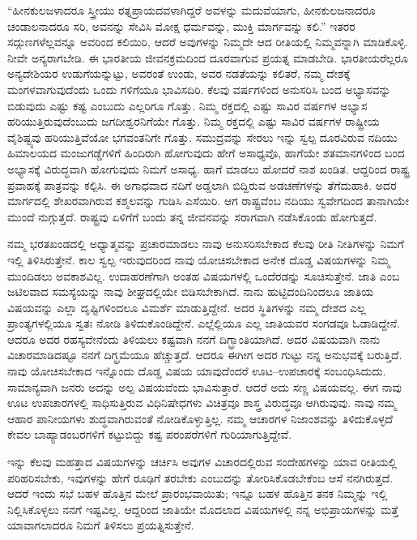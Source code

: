 “ಹೀನಕುಲಜಳಾದರೂ ಸ್ತ್ರೀಯು ರತ್ನಪ್ರಾಯದವಳಾಗಿದ್ದರೆ ಅವಳನ್ನು ಮದುವೆಯಾಗು, ಹೀನಕುಲಜನಾದರೂ ಚಂಡಾಲನಾದರೂ ಸರಿ, ಅವನನ್ನು ಸೇವಿಸಿ ಮೋಕ್ಷ ಧರ್ಮವನ್ನು, ಮುಕ್ತಿ ಮಾರ್ಗವನ್ನು ಕಲಿ.” ಇತರರ ಸದ್ಗುಣಗಳೆಲ್ಲವನ್ನೂ ಅವರಿಂದ ಕಲಿಯಿರಿ, ಆದರೆ ಅವುಗಳನ್ನು ನಿಮ್ಮದೇ ಆದ ರೀತಿಯಲ್ಲಿ ನಿಮ್ಮವನ್ನಾಗಿ ಮಾಡಿಕೊಳ್ಳಿ. ನೀವೇ ಅನ್ಯರಾಗಬೇಡಿ. ಈ ಭಾರತೀಯ ಜೀವನಕ್ರಮದಿಂದ ದೂರವಾಗುವ ಪ್ರಯತ್ನ ಮಾಡಬೇಡಿ. ಭಾರತೀಯರೆಲ್ಲರೂ ಅನ್ಯದೇಶಿಯರ ಉಡುಗೆಯನ್ನುಟ್ಟು, ಅವರಂತೆ ಉಂಡು, ಅವರ ನಡತೆಯನ್ನು ಕಲಿತರೆ, ನಮ್ಮ ದೇಶಕ್ಕೆ ಮಂಗಳವಾಗುವುದೆಂದು ಒಂದು ಗಳಿಗೆಯೂ ಭಾವಿಸದಿರಿ. ಕೆಲವು ವರ್ಷಗಳಿಂದ ಅನುಸರಿಸಿ ಬಂದ ಅಭ್ಯಾಸವನ್ನು ಬಿಡುವುದು ಎಷ್ಟು ಕಷ್ಟ ಎಂಬುದು ಎಲ್ಲರಿಗೂ ಗೊತ್ತು. ನಿಮ್ಮ ರಕ್ತದಲ್ಲಿ ಎಷ್ಟು ಸಾವಿರ ವರ್ಷಗಳ ಅಭ್ಯಾಸ ಹರಿಯುತ್ತಿರುವುದೆಂಬುದು ಜಗದೀಶ್ವರನಿಗೆಯೇ ಗೊತ್ತು. ನಿಮ್ಮ ರಕ್ತದಲ್ಲಿ ಎಷ್ಟು ಸಾವಿರ ವರ್ಷಗಳ ರಾಷ್ಟ್ರೀಯ ವೈಶಿಷ್ಟ್ಯವು ಹರಿಯುತ್ತಿವೆಯೋ ಭಗವಂತನಿಗೇ ಗೊತ್ತು. ಸಮುದ್ರವನ್ನು ಸೇರಲು ಇನ್ನು ಸ್ವಲ್ಪ ದೂರವಿರುವ ನದಿಯು ಹಿಮಾಲಯದ ಮಂಜುಗಡ್ಡೆಗಳಿಗೆ ಹಿಂದಿರುಗಿ ಹೋಗುವುದು ಹೇಗೆ ಅಸಾಧ್ಯವೊ, ಹಾಗೆಯೇ ಶತಮಾನಗಳಿಂದ ಬಂದ ಅಭ್ಯಾಸಕ್ಕೆ ವಿರುದ್ಧವಾಗಿ ಹೋಗುವುದು ನಿಮಗೆ ಅಸಾಧ್ಯ. ಹಾಗೆ ಮಾಡಲು ಹೋದರೆ ನಾಶ ಖಂಡಿತ. ಆದ್ದರಿಂದ ರಾಷ್ಟ್ರ ಪ್ರವಾಹಕ್ಕೆ ಪಾತ್ರವನ್ನು ಕಲ್ಪಿಸಿ. ಈ ಅಗಾಧವಾದ ನದಿಗೆ ಅಡ್ಡಲಾಗಿ ಬಿದ್ದಿರುವ ಅಡಚಣೆಗಳನ್ನು ತೆಗೆದುಹಾಕಿ. ಅದರ ಮಾರ್ಗದಲ್ಲಿ ಶೇಖರವಾಗಿರುವ ಕಶ್ಮಲವನ್ನು ಗುಡಿಸಿ ಎಸೆಯಿರಿ. ಆಗ ರಾಷ್ಟ್ರವೆಂಬ ನದಿಯು ಸ್ವವೇಗದಿಂದ ತಾನಾಗಿಯೇ ಮುಂದೆ ನುಗ್ಗುತ್ತದೆ. ರಾಷ್ಟ್ರವು ಏಳಿಗೆಗೆ ಬಂದು ತನ್ನ ಜೀವನವನ್ನು ಸರಾಗವಾಗಿ ನಡೆಸಿಕೊಂಡು ಹೋಗುತ್ತದೆ.

ನಮ್ಮ ಭರತಖಂಡದಲ್ಲಿ ಅಧ್ಯಾತ್ಮವನ್ನು ಪ್ರಚಾರಮಾಡಲು ನಾವು ಅನುಸರಿಸಬೇಕಾದ ಕೆಲವು ರೀತಿ ನೀತಿಗಳನ್ನು ನಿಮಗೆ ಇಲ್ಲಿ ತಿಳಿಸಿರುತ್ತೇನೆ. ಕಾಲ ಸ್ವಲ್ಪ ಇರುವುದರಿಂದ ನಾವು ಯೋಚಿಸಬೇಕಾದ ಅನೇಕ ದೊಡ್ಡ ವಿಷಯಗಳನ್ನು ನಿಮ್ಮ ಮುಂದಿಡಲು ಅವಕಾಶವಿಲ್ಲ. ಉದಾಹರಣೆಗಾಗಿ ಅಂತಹ ವಿಷಯಗಳಲ್ಲಿ ಒಂದೆರಡನ್ನು ಸೂಚಿಸುತ್ತೇನೆ. ಜಾತಿ ಎಂಬ ಜಟಿಲವಾದ ಸಮಸ್ಯೆಯನ್ನು ನಾವು ಶೀಘ್ರದಲ್ಲಿಯೇ ಬಿಡಿಸಬೇಕಾಗಿದೆ. ನಾನು ಹುಟ್ಟಿದಂದಿನಿಂದಲೂ ಜಾತಿಯ ವಿಷಯವನ್ನು ಎಲ್ಲಾ ದೃಷ್ಟಿಗಳಿಂದಲೂ ವಿಮರ್ಶೆ ಮಾಡುತ್ತಿದ್ದೇನೆ. ಅದರ ಸ್ಥಿತಿಗಳನ್ನು ನಮ್ಮ ದೇಶದ ಎಲ್ಲ ಪ್ರಾಂತ್ಯಗಳಲ್ಲಿಯೂ ಸ್ವತಃ ನೋಡಿ ತಿಳಿದುಕೊಂಡಿದ್ದೇನೆ. ಎಲ್ಲೆಲ್ಲಿಯೂ ಎಲ್ಲ ಜಾತಿಯವರ ಸಂಗಡವೂ ಓಡಾಡಿದ್ದೇನೆ. ಆದರೂ ಅದರ ರಹಸ್ಯವೇನೆಂದು ತಿಳಿಯಲು ಕಷ್ಟವಾಗಿ ನನಗೆ ದಿಗ್ಭ್ರಾಂತಿಯಾಗಿದೆ. ಅದರ ವಿಷಯವಾಗಿ ನಾನು ವಿಚಾರಮಾಡಿದಷ್ಟೂ ನನಗೆ ದಿಗ್ಭ್ರಮೆಯೂ ಹೆಚ್ಚುತ್ತದೆ. ಆದರೂ ಈಗೀಗ ಅದರ ಗುಟ್ಟು ನನ್ನ ಅನುಭವಕ್ಕೆ ಬರುತ್ತಿದೆ. ನಾವು ಯೋಚಿಸಬೇಕಾದ ಇನ್ನೊಂದು ದೊಡ್ಡ ವಿಷಯ ಯಾವುದೆಂದರೆ ಊಟ–ಉಪಚಾರಕ್ಕೆ ಸಂಬಂಧಿಸಿದುದು. ಸಾಮಾನ್ಯವಾಗಿ ಜನರು ಅದನ್ನು ಅಲ್ಪ ವಿಷಯವೆಂದು ಭಾವಿಸುತ್ತಾರೆ. ಆದರೆ ಅದು ಸಣ್ಣ ವಿಷಯವಲ್ಲ. ಈಗ ನಾವು ಊಟ ಉಪಚಾರಗಳಲ್ಲಿ ಸಾಧಿಸುತ್ತಿರುವ ವಿಧಿನಿಷೇಧಗಳು ವಿಚಿತ್ರವೂ ಶಾಸ್ತ್ರ ವಿರುದ್ಧವೂ ಆಗಿರುವುವು. ನಾವು ನಮ್ಮ ಆಹಾರ ಪಾನೀಯಗಳು ಶುದ್ಧವಾಗಿರುವಂತೆ ನೋಡಿಕೊಳ್ಳುತ್ತಿಲ್ಲ. ನಮ್ಮ ಆಚಾರಗಳ ನಿಜಾಂಶವನ್ನು ತಿಳಿದುಕೊಳ್ಳದೆ ಕೇವಲ ಬಾಹ್ಯಾಡಂಬರಗಳಿಗೆ ಕಟ್ಟುಬಿದ್ದು ಕಷ್ಟ ಪರಂಪರೆಗಳಿಗೆ ಗುರಿಯಾಗುತ್ತಿದ್ದೇವೆ.

ಇನ್ನು ಕೆಲವು ಮಹತ್ತಾದ ವಿಷಯಗಳನ್ನು ಚರ್ಚಿಸಿ ಅವುಗಳ ವಿಚಾರದಲ್ಲಿರುವ ಸಂದೇಹಗಳನ್ನು ಯಾವ ರೀತಿಯಲ್ಲಿ ಪರಿಹರಿಸಬೇಕು, ಇವುಗಳನ್ನು ಹೇಗೆ ರೂಢಿಗೆ ತರಬೇಕು ಎಂಬುದನ್ನು ತೋರಿಸಿಕೊಡಬೇಕೆಂಬ ಆಸೆ ನನಗಿರುತ್ತದೆ. ಆದರೆ ಇಂದು ಸಭೆ ಬಹಳ ಹೊತ್ತಿನ ಮೇಲೆ ಪ್ರಾರಂಭವಾಯಿತು; ಇನ್ನೂ ಬಹಳ ಹೊತ್ತಿನ ತನಕ ನಿಮ್ಮನ್ನು ಇಲ್ಲಿ ನಿಲ್ಲಿಸಿಕೊಳ್ಳಲು ನನಗೆ ಇಷ್ಟವಿಲ್ಲ. ಆದ್ದರಿಂದ ಜಾತಿಯೇ ಮೊದಲಾದ ವಿಷಯಗಳಲ್ಲಿ ನನ್ನ ಅಭಿಪ್ರಾಯಗಳನ್ನು ಮತ್ತೆ ಯಾವಾಗಲಾದರೂ ನಿಮಗೆ ತಿಳಿಸಲು ಪ್ರಯತ್ನಿಸುತ್ತೇನೆ.

